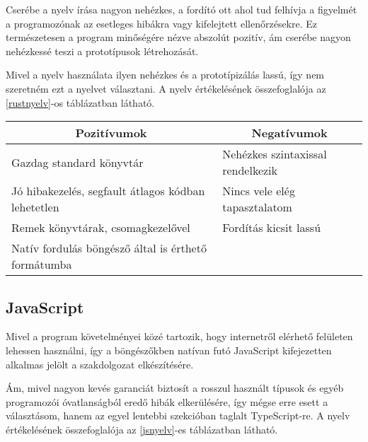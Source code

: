 Cserébe a nyelv írása nagyon nehézkes, a fordító ott ahol tud felhívja a figyelmét a programozónak az esetleges hibákra vagy kifelejtett ellenőrzésekre. Ez természetesen a program minőségére nézve abszolút pozitív, ám cserébe nagyon nehézkessé teszi a prototípusok létrehozását.

Mivel a nyelv használata ilyen nehézkes és a prototípizálás lassú, így nem szeretném ezt a nyelvet választani. A nyelv értékelésének összefoglalója az \ref{rustnyelv}-os táblázatban látható.

\begin{center}
  \begin{tabularx}{\textwidth}{X X}
    \hline
    \multicolumn{1}{c}{\bfseries{Pozitívumok}}         & \multicolumn{1}{c}{\bfseries{Negatívumok}} \\
    \hline
    Gazdag standard könyvtár                           & Nehézkes szintaxissal rendelkezik          \\
    Jó hibakezelés, segfault átlagos kódban lehetetlen & Nincs vele elég tapasztalatom              \\
    Remek könyvtárak, csomagkezelővel                  & Fordítás kicsit lassú                      \\
    Natív fordulás böngésző által is érthető formátumba                                             \\
    \hline
  \end{tabularx}
\end{center}

\newpage

\subsection{JavaScript}

Mivel a program követelményei közé tartozik, hogy internetről elérhető felületen lehessen használni, így a böngészőkben natívan futó JavaScript kifejezetten alkalmas jelölt a szakdolgozat elkészítésére.

Ám, mivel nagyon kevés garanciát biztosít a rosszul használt típusok és egyéb programozói óvatlanságból eredő hibák elkerülésére, így mégse erre esett a választásom, hanem az egyel lentebbi szekcióban taglalt TypeScript-re. A nyelv értékelésének összefoglalója az \ref{jsnyelv}-es táblázatban látható.

